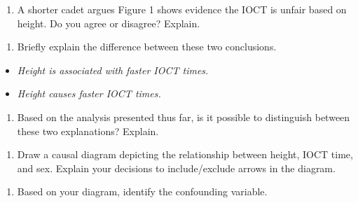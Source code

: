 \documentclass[
]{book}
\providecommand{\tightlist}{%
  \setlength{\itemsep}{0pt}\setlength{\parskip}{0pt}}
\begin{document}
\vspace{1in}

\begin{enumerate}
\def\labelenumi{\arabic{enumi}.}
\setcounter{enumi}{7}
\tightlist
\item
  A shorter cadet argues Figure 1 shows evidence the IOCT is unfair based on height. Do you agree or disagree? Explain.
\end{enumerate}

\vspace{1in}

\begin{enumerate}
\def\labelenumi{\arabic{enumi}.}
\setcounter{enumi}{8}
\tightlist
\item
  Briefly explain the difference between these two conclusions.
\end{enumerate}

\begin{itemize}
\item
  \emph{Height is associated with faster IOCT times.}
\item
  \emph{Height causes faster IOCT times.}
\end{itemize}

\vspace{1in}

\begin{enumerate}
\def\labelenumi{\arabic{enumi}.}
\setcounter{enumi}{9}
\tightlist
\item
  Based on the analysis presented thus far, is it possible to distinguish between these two explanations? Explain.
\end{enumerate}

\vspace{1in}

\begin{enumerate}
\def\labelenumi{\arabic{enumi}.}
\setcounter{enumi}{10}
\tightlist
\item
  Draw a causal diagram depicting the relationship between height, IOCT time, and sex. Explain your decisions to include/exclude arrows in the diagram.
\end{enumerate}

\vspace{1in}

\begin{enumerate}
\def\labelenumi{\arabic{enumi}.}
\setcounter{enumi}{11}
\tightlist
\item
  Based on your diagram, identify the confounding variable.
\end{enumerate}
\end{document}
